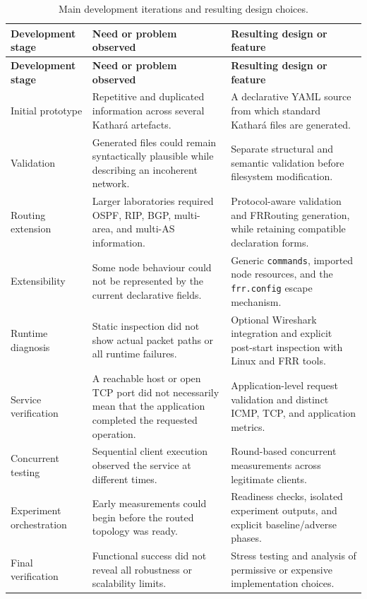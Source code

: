 {\small
\begin{longtable}{>{\raggedright\arraybackslash}p{}>{\raggedright\arraybackslash}p{}>{\raggedright\arraybackslash}p{}}
\caption{Main development iterations and resulting design choices.}
\label{tab:development-evolution}\\
\toprule
\textbf{Development stage} & \textbf{Need or problem observed} & \textbf{Resulting design or feature} \\
\midrule
\endfirsthead
\toprule
\textbf{Development stage} & \textbf{Need or problem observed} & \textbf{Resulting design or feature} \\
\midrule
\endhead
Initial prototype & Repetitive and duplicated information across several Kathar\'a artefacts. & A declarative YAML source from which standard Kathar\'a files are generated. \\
Validation & Generated files could remain syntactically plausible while describing an incoherent network. & Separate structural and semantic validation before filesystem modification. \\
Routing extension & Larger laboratories required OSPF, RIP, BGP, multi-area, and multi-AS information. & Protocol-aware validation and FRRouting generation, while retaining compatible declaration forms. \\
Extensibility & Some node behaviour could not be represented by the current declarative fields. & Generic \texttt{commands}, imported node resources, and the \texttt{frr.config} escape mechanism. \\
Runtime diagnosis & Static inspection did not show actual packet paths or all runtime failures. & Optional Wireshark integration and explicit post-start inspection with Linux and FRR tools. \\
Service verification & A reachable host or open TCP port did not necessarily mean that the application completed the requested operation. & Application-level request validation and distinct ICMP, TCP, and application metrics. \\
Concurrent testing & Sequential client execution observed the service at different times. & Round-based concurrent measurements across legitimate clients. \\
Experiment orchestration & Early measurements could begin before the routed topology was ready. & Readiness checks, isolated experiment outputs, and explicit baseline/adverse phases. \\
Final verification & Functional success did not reveal all robustness or scalability limits. & Stress testing and analysis of permissive or expensive implementation choices. \\
\bottomrule
\end{longtable}
}

